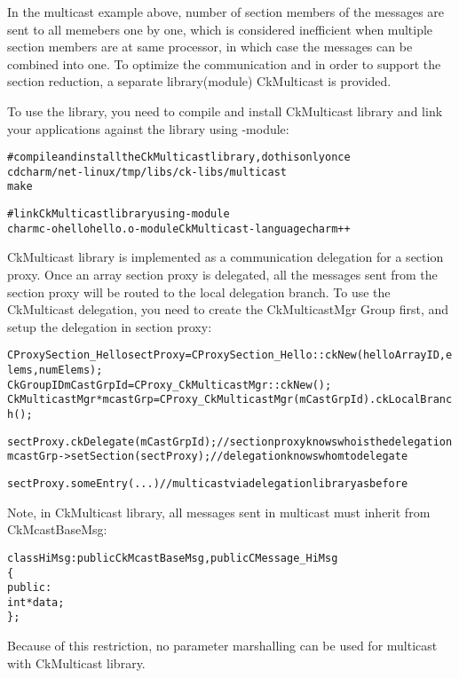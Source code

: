 In the multicast example above, number of section members of the messages are 
sent to all memebers one by one, which is considered inefficient when multiple 
section members are at same processor, in which case the messages can be 
combined into one. To optimize the communication and in order to support the
section reduction, a separate library(module) CkMulticast is provided.

To use the library, you need to compile and install CkMulticast library and 
link your applications against the library using -module:

\begin{alltt}
  # compile and install the CkMulticast library, do this only once
  cd charm/net-linux/tmp/libs/ck-libs/multicast
  make

  # link CkMulticast library using -module
  charmc  -o hello hello.o -module CkMulticast -language charm++ 
\end{alltt}

CkMulticast library is implemented as a communication delegation for a 
section proxy. Once an array section proxy is delegated, all the messages sent
from the section proxy will be routed to the local delegation branch. 
To use the CkMulticast delegation, you need to create the CkMulticastMgr Group 
first, and setup the delegation in section proxy:

\begin{alltt}
  CProxySection_Hello sectProxy = CProxySection_Hello::ckNew(helloArrayID, elems, numElems);
  CkGroupID mCastGrpId = CProxy_CkMulticastMgr::ckNew();
  CkMulticastMgr *mcastGrp = CProxy_CkMulticastMgr(mCastGrpId).ckLocalBranch();

  sectProxy.ckDelegate(mCastGrpId);  //section proxy knows who is the delegation
  mcastGrp->setSection(sectProxy);   //delegation knows whom to delegate

  sectProxy.someEntry(...)           //multicast via delegation library as before
\end{alltt}

Note, in CkMulticast library, all messages sent in multicast must inherit 
from CkMcastBaseMsg:

\begin{alltt}
class HiMsg : public CkMcastBaseMsg, public CMessage_HiMsg
\{
public:
  int *data;
\};
\end{alltt}

Because of this restriction, no parameter marshalling can be used for multicast
with CkMulticast library.

